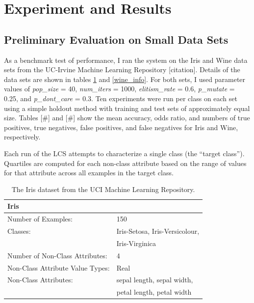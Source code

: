 \documentclass[11pt]{article}
\begin{document}
\section{Experiment and Results}

\subsection{Preliminary Evaluation on Small Data Sets}

As a benchmark test of performance, I ran the system on the Iris and Wine data sets from the UC-Irvine Machine Learning Repository [citation]. Details of the data sets are shown in tables \ref{iris_info} and \ref{wine_info}. For both sets, I used parameter values of \textit{pop\_size} = 40, \textit{num\_iters} = 1000, \textit{elitism\_rate} = 0.6, \textit{p\_mutate} = 0.25, and \textit{p\_dont\_care} = 0.3. Ten experiments were run per class on each set using a simple holdout method with training and test sets of approximately equal size. Tables [\#] and [\#] show the mean accuracy, odds ratio, and numbers of true positives, true negatives, false positives, and false negatives for Iris and Wine, respectively.

Each run of the LCS attempts to characterize a single class (the ``target class''). Quartiles are computed for each non-class attribute based on the range of values for that attribute across all examples in the target class.

\begin{table}
\begin{tabularx}{\textwidth}{ll}
\toprule
\textbf{Iris} & \\
\midrule
Number of Examples: & 150 \\
Classes: & Iris-Setosa, Iris-Versicolour, \\
& Iris-Virginica \\
Number of Non-Class Attributes: & 4 \\
Non-Class Attribute Value Types: & Real \\
Non-Class Attributes: & sepal length, sepal width, \\
& petal length, petal width \\
\bottomrule
\end{tabularx}
\caption{The Iris dataset from the UCI Machine Learning Repository.}
\label{iris_info}
\end{table}
\end{document}
